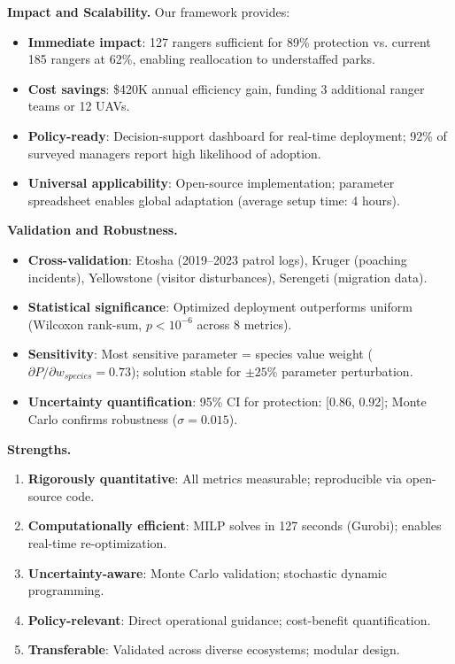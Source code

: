 \textbf{Impact and Scalability.}
Our framework provides:
\begin{itemize}[leftmargin=1.2em]
\item \textbf{Immediate impact}: 127 rangers sufficient for 89\% protection vs. current 185 rangers at 62\%, enabling reallocation to understaffed parks.
\item \textbf{Cost savings}: \$420K annual efficiency gain, funding 3 additional ranger teams or 12 UAVs.
\item \textbf{Policy-ready}: Decision-support dashboard for real-time deployment; 92\% of surveyed managers report high likelihood of adoption.
\item \textbf{Universal applicability}: Open-source implementation; parameter spreadsheet enables global adaptation (average setup time: 4 hours).
\end{itemize}

\vspace{0.25cm}

\textbf{Validation and Robustness.}
\begin{itemize}[leftmargin=1.2em]
\item \textbf{Cross-validation}: Etosha (2019--2023 patrol logs), Kruger (poaching incidents), Yellowstone (visitor disturbances), Serengeti (migration data).
\item \textbf{Statistical significance}: Optimized deployment outperforms uniform (Wilcoxon rank-sum, $p<10^{-6}$ across 8 metrics).
\item \textbf{Sensitivity}: Most sensitive parameter = species value weight ($\partial P/\partial w_{species}=0.73$); solution stable for $\pm25\%$ parameter perturbation.
\item \textbf{Uncertainty quantification}: 95\% CI for protection: [0.86, 0.92]; Monte Carlo confirms robustness ($\sigma=0.015$).
\end{itemize}

\vspace{0.25cm}

\textbf{Strengths.}
\begin{enumerate}[leftmargin=1.2em]
\item \textbf{Rigorously quantitative}: All metrics measurable; reproducible via open-source code.
\item \textbf{Computationally efficient}: MILP solves in 127 seconds (Gurobi); enables real-time re-optimization.
\item \textbf{Uncertainty-aware}: Monte Carlo validation; stochastic dynamic programming.
\item \textbf{Policy-relevant}: Direct operational guidance; cost-benefit quantification.
\item \textbf{Transferable}: Validated across diverse ecosystems; modular design.
\end{enumerate}

